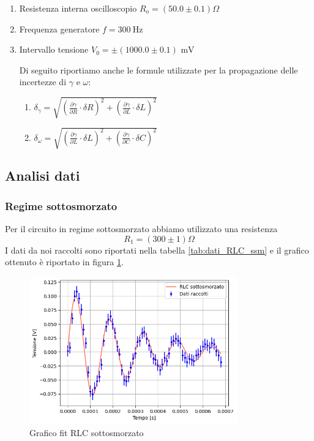 \documentclass[letterpaper,12pt]{article}
\begin{document}
\begin{enumerate}[itemsep=1pt]
	\item Resistenza interna oscilloscopio $R_o = (50.0\pm0.1)\Omega$
	\item Frequenza generatore $f = \SI{300}{\hertz}$
	\item Intervallo tensione $V_0= \pm (1000.0\pm0.1)\text{ mV}$

	      Di seguito riportiamo anche le formule utilizzate per la propagazione delle incertezze di $\gamma$ e $\omega$:

	      \begin{enumerate}
		      \item $ \delta_{\gamma} = \sqrt{(\frac{\partial \gamma}{\partial R} \cdot \delta R)^2 + (\frac{\partial \gamma}{\partial L}\cdot \delta L)^2} $
		      \item $ \delta_{\omega} = \sqrt{(\frac{\partial \gamma}{\partial L} \cdot \delta L)^2 + (\frac{\partial \gamma}{\partial C}\cdot \delta C)^2} $
	      \end{enumerate}
\end{enumerate}
\newpage

\subsection{Analisi dati}

\subsubsection{Regime sottosmorzato}
Per il circuito in regime sottosmorzato abbiamo utilizzato una resistenza $$R_1 =(300\pm1) \Omega $$
I dati da noi raccolti sono riportati nella tabella \ref{tab:dati_RLC_ssm} e il grafico ottenuto è riportato in figura \ref{fig:fitRLCsotto}.


\begin{figure}[h!]
	\centering
	\includegraphics[width=0.8\textwidth]{RLCsotto.png}
	\caption{Grafico fit RLC sottosmorzato}
	\label{fig:fitRLCsotto}
\end{figure}
\end{document}
